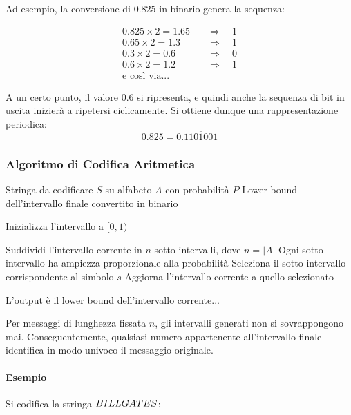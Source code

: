 Ad esempio, la conversione di $0.825$ in binario genera la sequenza:

\begin{align*}
0.825 \times 2 = 1.65 & \quad \Rightarrow \quad 1 \\
0.65 \times 2 = 1.3  & \quad \Rightarrow \quad 1 \\
0.3 \times 2 = 0.6   & \quad \Rightarrow \quad 0 \\
0.6 \times 2 = 1.2   & \quad \Rightarrow \quad 1 \\
\text{e così via...}
\end{align*}


A un certo punto, il valore 0.6 si ripresenta, e quindi anche la sequenza di bit in uscita inizierà a ripetersi ciclicamente. Si ottiene dunque una rappresentazione periodica:
\[0.825 = 0.\overline{1101001}\]

\subsubsection{Algoritmo di Codifica Aritmetica}
\begin{algorithm}
\caption{Codifica aritmetica}
\begin{algorithmic}[1] %
    \Require Stringa da codificare $S$ su alfabeto $A$ con probabilità $P$
    \Ensure Lower bound dell'intervallo finale convertito in binario

    \State Inizializza l'intervallo a $[0, 1)$

        \State Suddividi l'intervallo corrente in $n$ sotto intervalli, dove $n = |A|$
        \State Ogni sotto intervallo ha ampiezza proporzionale alla probabilità
        \State Seleziona il sotto intervallo corrispondente al simbolo $s$
        \State Aggiorna l'intervallo corrente a quello selezionato
    \EndFor

    \State \Return L'output è il lower bound dell'intervallo corrente...
\end{algorithmic}
\end{algorithm}



Per messaggi di lunghezza fissata $n$, gli intervalli generati non si sovrappongono mai. Conseguentemente, qualsiasi numero appartenente all'intervallo finale identifica in modo univoco il messaggio originale.
\paragraph{Esempio}
Si codifica la  stringa $BILL\space GATES$:

